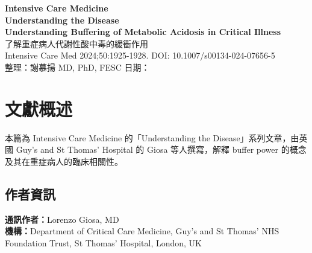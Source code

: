 \documentclass[12pt,a4paper]{article}
\begin{document}
\begin{center}
{\LARGE\bfseries\textcolor{emergency_red}{Intensive Care Medicine}}\\[0.3cm]
{\Large\textbf{Understanding the Disease}}\\[0.5cm]
{\Large\textbf{Understanding Buffering of Metabolic Acidosis in Critical Illness}}\\[0.3cm]
{\large 了解重症病人代謝性酸中毒的緩衝作用}\\[0.5cm]
{\normalsize Intensive Care Med 2024;50:1925-1928. DOI: 10.1007/s00134-024-07656-5}\\[0.3cm]
{\normalsize 整理：謝慕揚 MD, PhD, FESC \quad 日期：\mydate}
\end{center}


\tableofcontents
\newpage

\section{文獻概述}

本篇為 Intensive Care Medicine 的「Understanding the Disease」系列文章，由英國 Guy's and St Thomas' Hospital 的 Giosa 等人撰寫，解釋 buffer power 的概念及其在重症病人的臨床相關性。

\subsection{作者資訊}
\textbf{通訊作者：}Lorenzo Giosa, MD\\
\textbf{機構：}Department of Critical Care Medicine, Guy's and St Thomas' NHS Foundation Trust, St Thomas' Hospital, London, UK
\end{document}
